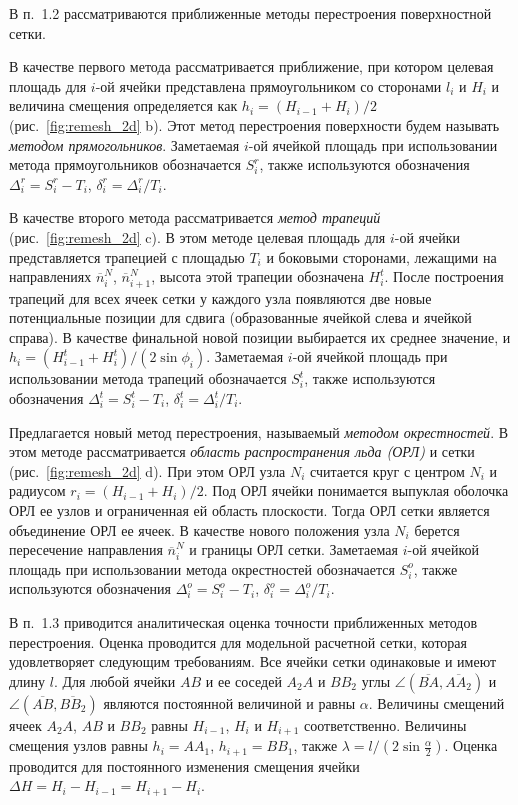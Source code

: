 \documentclass[a4paper,14pt]{extarticle}                     %
\theoremstyle{plain}                                         %
\begin{document}

В п.~1.2 рассматриваются приближенные методы перестроения поверхностной сетки.

В качестве первого метода рассматривается приближение, при котором целевая площадь для $i$-ой ячейки представлена прямоугольником со сторонами $l_i$ и $H_i$ и величина смещения определяется как $h_i = (H_{i - 1} + H_i)/2$ (рис.~\ref{fig:remesh_2d} b).
Этот метод перестроения поверхности будем называть \textit{методом прямогольников}.
Заметаемая $i$-ой ячейкой площадь при использовании метода прямоугольников обозначается $S_i^r$, также используются обозначения $\Delta_i^r = S_i^r - T_i$, $\delta_i^r = \Delta_i^r / T_i$.

В качестве второго метода рассматривается \textit{метод трапеций} (рис.~\ref{fig:remesh_2d} c).
В этом методе целевая площадь для $i$-ой ячейки представляется трапецией с площадью $T_i$ и боковыми сторонами, лежащими на направлениях $\overline{n}_i^N$, $\overline{n}_{i + 1}^N$, высота этой трапеции обозначена $H_i^t$.
После построения трапеций для всех ячеек сетки у каждого узла появляются две новые потенциальные позиции для сдвига (образованные ячейкой слева и ячейкой справа).
В качестве финальной новой позиции выбирается их среднее значение, и $h_i = (H_{i - 1}^t + H_i^t) / (2 \sin \phi_i)$.
Заметаемая $i$-ой ячейкой площадь при использовании метода трапеций обозначается $S_i^t$, также используются обозначения $\Delta_i^t = S_i^t - T_i$, $\delta_i^t = \Delta_i^t / T_i$.

Предлагается новый метод перестроения, называемый \textit{методом окрестностей}.
В этом методе рассматривается \textit{область распространения льда (ОРЛ)} и сетки (рис.~\ref{fig:remesh_2d} d).
При этом ОРЛ узла $N_i$ считается круг с центром $N_i$ и радиусом $r_i = (H_{i - 1} + H_i)/2$.
Под ОРЛ ячейки понимается выпуклая оболочка ОРЛ ее узлов и ограниченная ей область плоскости.
Тогда ОРЛ сетки является объединение ОРЛ ее ячеек.
В качестве нового положения узла $N_i$ берется пересечение направления $\overline{n}_i^N$ и границы ОРЛ сетки.
Заметаемая $i$-ой ячейкой площадь при использовании метода окрестностей обозначается $S_i^o$, также используются обозначения $\Delta_i^o = S_i^o - T_i$, $\delta_i^o = \Delta_i^o / T_i$.


В п.~1.3 приводится аналитическая оценка точности приближенных методов перестроения.
Оценка проводится для модельной расчетной сетки, которая удовлетворяет следующим требованиям.
Все ячейки сетки одинаковые и имеют длину $l$.
Для любой ячейки $AB$ и ее соседей $A_2A$ и $BB_2$ углы $\angle (\overline{BA}, \overline{AA_2})$ и $\angle (\overline{AB}, \overline{BB_2})$ являются постоянной величиной и равны $\alpha$.
Величины смещений ячеек $A_2A$, $AB$ и $BB_2$ равны $H_{i - 1}$, $H_i$ и $H_{i + 1}$ соответственно.
Величины смещения узлов равны $h_i = AA_1$, $h_{i + 1} = BB_1$, также $\lambda = l / (2 \sin \frac{\alpha}{2})$.
Оценка проводится для постоянного изменения смещения ячейки $\Delta H = H_i - H_{i - 1} = H_{i + 1} - H_i$.
\end{document}
